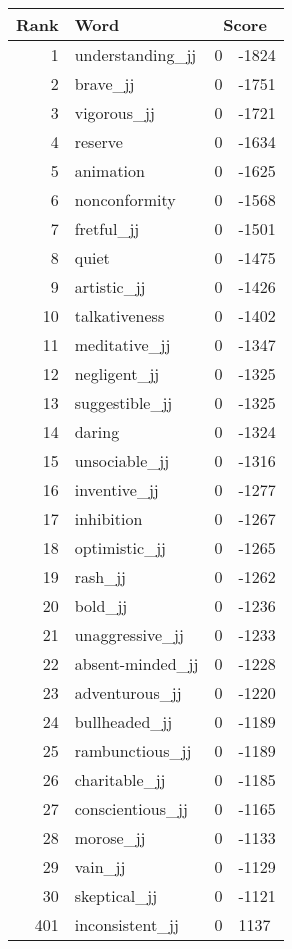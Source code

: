 \begin{longtable}[!htbp]{| rlr@{.}l |}
    \hline
    \textbf{Rank} & \textbf{Word} & \multicolumn{2}{c|}{\textbf{Score}} \\
    \hline
    \endhead
    1 & understanding\_jj & 0 & -1824 \\
    2 & brave\_jj & 0 & -1751 \\
    3 & vigorous\_jj & 0 & -1721 \\
    4 & reserve & 0 & -1634 \\
    5 & animation & 0 & -1625 \\
    6 & nonconformity & 0 & -1568 \\
    7 & fretful\_jj & 0 & -1501 \\
    8 & quiet & 0 & -1475 \\
    9 & artistic\_jj & 0 & -1426 \\
    10 & talkativeness & 0 & -1402 \\
    11 & meditative\_jj & 0 & -1347 \\
    12 & negligent\_jj & 0 & -1325 \\
    13 & suggestible\_jj & 0 & -1325 \\
    14 & daring & 0 & -1324 \\
    15 & unsociable\_jj & 0 & -1316 \\
    16 & inventive\_jj & 0 & -1277 \\
    17 & inhibition & 0 & -1267 \\
    18 & optimistic\_jj & 0 & -1265 \\
    19 & rash\_jj & 0 & -1262 \\
    20 & bold\_jj & 0 & -1236 \\
    21 & unaggressive\_jj & 0 & -1233 \\
    22 & absent-minded\_jj & 0 & -1228 \\
    23 & adventurous\_jj & 0 & -1220 \\
    24 & bullheaded\_jj & 0 & -1189 \\
    25 & rambunctious\_jj & 0 & -1189 \\
    26 & charitable\_jj & 0 & -1185 \\
    27 & conscientious\_jj & 0 & -1165 \\
    28 & morose\_jj & 0 & -1133 \\
    29 & vain\_jj & 0 & -1129 \\
    30 & skeptical\_jj & 0 & -1121 \\
    401 & inconsistent\_jj & 0 & 1137 \\

\end{longtable}
